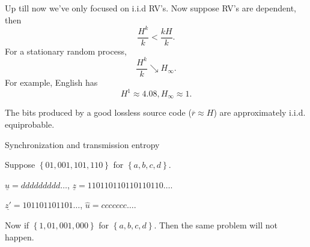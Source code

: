 \documentclass{report}
\newcommand{\set}[1]{\left\lbrace #1 \right\rbrace}
\theoremstyle{definition}
\theoremstyle{remark}
\numberwithin{equation}{section}
\begin{document}
Up till now we've only focused on i.i.d RV's. Now suppose RV's are dependent, then \[\frac{H^k}{k} < \frac{kH}{k}.\]
For a stationary random process, \[
  \frac{H^k}{k} \searrow H_\infty.  
\] For example, English has \[
  H^1 \approx 4.08, H_\infty \approx 1.  
\]

The bits produced by a good lossless source code ($\overline{r} \approx H$) are approximately i.i.d. equiprobable.

Synchronization and transmission entropy

Suppose $\set{01, 001, 101, 110}$ for $\set{a, b, c, d}$. 

$\underline{u} = ddddddddd\ldots$, $\underline{z}= 110110110110110110\ldots$.

$\underline{z'}=101101101101\ldots$, $\hat{u} = ccccccc\ldots$.

Now if $\set{1, 01, 001, 000}$ for $\set{a, b, c, d}$. Then the same problem will not happen.
\end{document}

